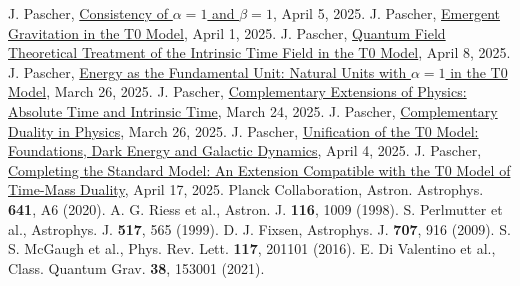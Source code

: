 \documentclass[12pt,a4paper]{article}
\begin{document}
\begin{thebibliography}{99}
		 J. Pascher, \href{https://github.com/jpascher/T0-Time-Mass-Duality/tree/main/2/pdf/English/Alpha1Beta1KonsistenzEn.pdf}{Consistency of \(\alpha = 1\) and \(\beta = 1\)}, April 5, 2025.
		 J. Pascher, \href{https://github.com/jpascher/T0-Time-Mass-Duality/tree/main/2/pdf/English/EmergentGravT0En.pdf}{Emergent Gravitation in the T0 Model}, April 1, 2025.
		 J. Pascher, \href{https://github.com/jpascher/T0-Time-Mass-Duality/tree/main/2/pdf/English/QFTIntrinsischesZeitT0En.pdf}{Quantum Field Theoretical Treatment of the Intrinsic Time Field in the T0 Model}, April 8, 2025.
		 J. Pascher, \href{https://github.com/jpascher/T0-Time-Mass-Duality/tree/main/2/pdf/English/NatEinheitenAlpha1En.pdf}{Energy as the Fundamental Unit: Natural Units with \(\alpha = 1\) in the T0 Model}, March 26, 2025.
		 J. Pascher, \href{https://github.com/jpascher/T0-Time-Mass-Duality/tree/main/2/pdf/English/KomplementPhysikZeitEn.pdf}{Complementary Extensions of Physics: Absolute Time and Intrinsic Time}, March 24, 2025.
		 J. Pascher, \href{https://github.com/jpascher/T0-Time-Mass-Duality/tree/main/2/pdf/English/KurzKomplementDualPhysikEn.pdf}{Complementary Duality in Physics}, March 26, 2025.
		 J. Pascher, \href{https://github.com/jpascher/T0-Time-Mass-Duality/tree/main/2/pdf/English/T0VereinheitlichungDEGalEn.pdf}{Unification of the T0 Model: Foundations, Dark Energy and Galactic Dynamics}, April 4, 2025.
		 J. Pascher, \href{https://github.com/jpascher/T0-Time-Mass-Duality/tree/main/2/pdf/English/StandardModKruemmungRotvEn.pdf}{Completing the Standard Model: An Extension Compatible with the T0 Model of Time-Mass Duality}, April 17, 2025.
		 Planck Collaboration, Astron. Astrophys. \textbf{641}, A6 (2020).
		 A. G. Riess et al., Astron. J. \textbf{116}, 1009 (1998).
		 S. Perlmutter et al., Astrophys. J. \textbf{517}, 565 (1999).
		 D. J. Fixsen, Astrophys. J. \textbf{707}, 916 (2009).
		 S. S. McGaugh et al., Phys. Rev. Lett. \textbf{117}, 201101 (2016).
		 E. Di Valentino et al., Class. Quantum Grav. \textbf{38}, 153001 (2021).
	\end{thebibliography}
	
\end{document}
